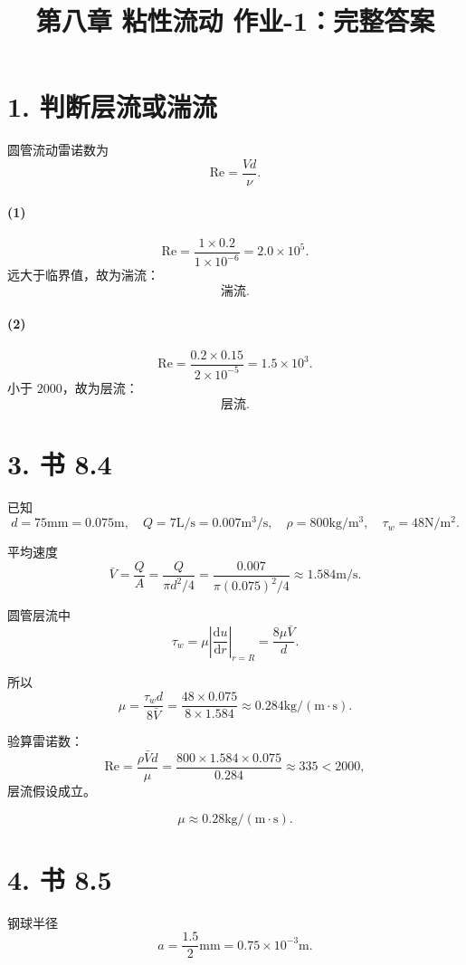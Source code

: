 \documentclass[12pt,a4paper]{ctexart}
\title{第八章 粘性流动 作业-1：完整答案}
\author{}
\date{}
\newcommand{\Rey}{\mathrm{Re}}
\newcommand{\dd}{\mathrm d}
\begin{document}
\maketitle

\section*{1. 判断层流或湍流}

圆管流动雷诺数为
\[
\Rey=\frac{Vd}{\nu}.
\]

\paragraph{(1)}
\[
\Rey=\frac{1\times0.2}{1\times10^{-6}}
=2.0\times10^5.
\]
远大于临界值，故为湍流：
\[
\boxed{\text{湍流}}.
\]

\paragraph{(2)}
\[
\Rey=\frac{0.2\times0.15}{2\times10^{-5}}
=1.5\times10^3.
\]
小于 \(2000\)，故为层流：
\[
\boxed{\text{层流}}.
\]

\section*{3. 书 8.4}

已知
\[
d=75\mathrm{mm}=0.075\mathrm m,\quad
Q=7\mathrm{L/s}=0.007\mathrm{m^3/s},\quad
\rho=800\mathrm{kg/m^3},\quad
\tau_w=48\mathrm{N/m^2}.
\]

平均速度
\[
\bar V=\frac{Q}{A}
=\frac{Q}{\pi d^2/4}
=\frac{0.007}{\pi(0.075)^2/4}
\approx1.584\mathrm{m/s}.
\]

圆管层流中
\[
\tau_w=\mu\left|\frac{\dd u}{\dd r}\right|_{r=R}
=\frac{8\mu \bar V}{d}.
\]

所以
\[
\mu=\frac{\tau_w d}{8\bar V}
=\frac{48\times0.075}{8\times1.584}
\approx0.284\mathrm{kg/(m\cdot s)}.
\]

验算雷诺数：
\[
\Rey=\frac{\rho \bar V d}{\mu}
=\frac{800\times1.584\times0.075}{0.284}
\approx335<2000,
\]
层流假设成立。

\[
\boxed{\mu\approx0.28\mathrm{kg/(m\cdot s)}}.
\]

\section*{4. 书 8.5}

钢球半径
\[
a=\frac{1.5}{2}\mathrm{mm}=0.75\times10^{-3}\mathrm m.
\]
\end{document}
